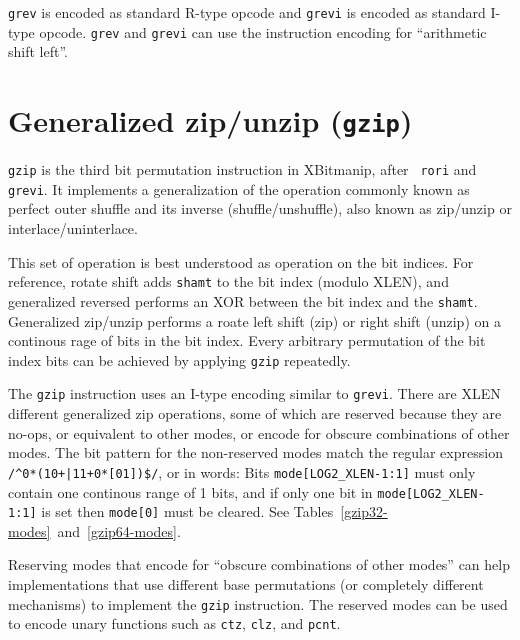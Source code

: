

\texttt{grev} is encoded as standard R-type opcode and \texttt{grevi} is
encoded as standard I-type opcode. \texttt{grev} and \texttt{grevi} can
use the instruction encoding for ``arithmetic shift left''.

%
%
%


\section{Generalized zip/unzip (\texttt{gzip})}
\label{gzip}

{\tt gzip} is the third bit permutation instruction in XBitmanip, after {\tt
rori} and {\tt grevi}. It implements a generalization of the operation commonly
known as perfect outer shuffle and its inverse (shuffle/unshuffle), also known
as zip/unzip or interlace/uninterlace.

This set of operation is best understood as operation on the bit indices. For
reference, rotate shift adds {\tt shamt} to the bit index (modulo XLEN), and
generalized reversed performs an XOR between the bit index and the {\tt shamt}.
Generalized zip/unzip performs a roate left shift (zip) or right shift (unzip)
on a continous rage of bits in the bit index. Every arbitrary permutation
of the bit index bits can be achieved by applying {\tt gzip} repeatedly.

The {\tt gzip} instruction uses an I-type encoding similar to {\tt grevi}.
There are XLEN different generalized zip operations, some of which are reserved
because they are no-ops, or equivalent to other modes, or encode for obscure
combinations of other modes. The bit pattern for the non-reserved modes
match the regular expression {\tt /\^{}0*(10+|11+0*[01])\$/}, or in words:
Bits {\tt mode[LOG2\_XLEN-1:1]} must only contain one continous range of
1 bits, and if only one bit in {\tt mode[LOG2\_XLEN-1:1]} is set then
{\tt mode[0]} must be cleared. See Tables~\ref{gzip32-modes}~and~\ref{gzip64-modes}.

Reserving modes that encode for ``obscure combinations of other modes'' can help
implementations that use different base permutations (or completely different
mechanisms) to implement the {\tt gzip} instruction. The reserved modes can be
used to encode unary functions such as {\tt ctz}, {\tt clz}, and {\tt pcnt}.

